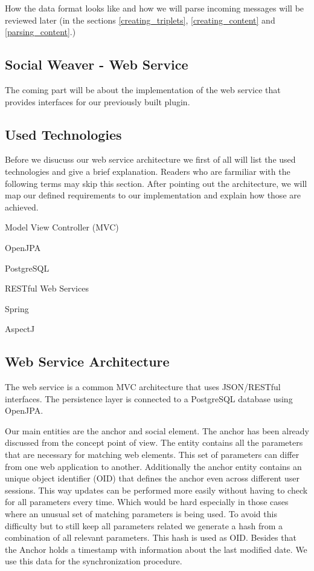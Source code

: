 How the data format looks like and how we will parse incoming messages will be reviewed later (in the sections \ref{creating_triplets}, \ref{creating_content} and \ref{parsing_content}.)

\newpage
\subsection{Social Weaver - Web Service}
The coming part will be about the implementation of the web service that provides interfaces for our previously built plugin.

\subsection{Used Technologies}
Before we disucuss our web service architecture we first of all will list the used technologies and give a brief explanation. Readers who are farmiliar with the following terms may skip this section. 
After pointing out the architecture, we will map our defined requirements to our implementation and explain how those are achieved.

\begin{description}
	\item Model View Controller (MVC)
	\item OpenJPA
	\item PostgreSQL
	\item RESTful Web Services
	\item Spring
	\item AspectJ
\end{description}

\subsection{Web Service Architecture}
The web service is a common MVC architecture that uses JSON/RESTful interfaces. The persistence layer is connected to a PostgreSQL database using OpenJPA. 

Our main entities are the anchor and social element. The anchor has been already discussed from the concept point of view. The entity contains all the parameters that are necessary for matching web elements. This set of parameters can differ from one web application to another. Additionally the anchor entity contains an unique object identifier (OID) that defines the anchor even across different user sessions. This way updates can be performed more easily without having to check for all parameters every time. Which would be hard especially in those cases where an unusual set of matching parameters is being used. To avoid this difficulty but to still keep all parameters related we generate a hash from a combination of all relevant parameters. This hash is used as OID. 
Besides that the Anchor holds a timestamp with information about the last modified date. We use this data for the synchronization procedure. 

